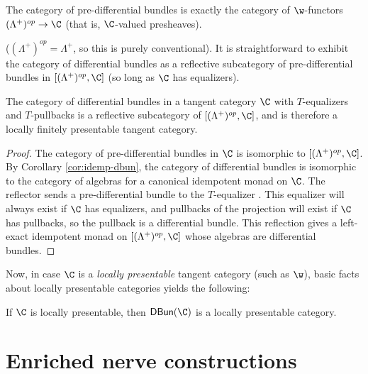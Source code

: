 \begin{lemma}%
	\label{lem:lambda-plus-is-pdb}
	The category of pre-differential bundles is exactly the category of $\w$-functors $(\Lambda^+)^{op} \to \C$ (that is, $\C$-valued presheaves).
\end{lemma}
($(\Lambda^+)^{op} = \Lambda^+$, so this is purely conventional).
It is straightforward to exhibit the category of differential bundles as a reflective subcategory of pre-differential bundles in $[(\Lambda^+)^{op}, \C]$ (so long as $\C$ has equalizers).
\begin{proposition}%
	\label{prop:Lambda-is-refl-subcat}
	The category of differential bundles in a tangent category $\C$ with $T$-equalizers and $T$-pullbacks is a reflective subcategory of $[(\Lambda^+)^{op}, \C]$, and is therefore a locally finitely presentable tangent category.
\end{proposition}
\begin{proof}
	The category of pre-differential bundles in $\C$ is isomorphic to $[(\Lambda^+)^{op}, \C]$. By Corollary \ref{cor:idemp-dbun}, the category of differential bundles is isomorphic to the category of algebras for a canonical idempotent monad on $\C$. The reflector sends a pre-differential bundle to the $T$-equalizer . This equalizer will always exist if $\C$ has equalizers, and pullbacks of the projection will exist if $\C$ has pullbacks, so the pullback is a differential bundle. This reflection gives a left-exact idempotent monad on $[(\Lambda^+)^{op}, \C]$ whose algebras are differential bundles.
\end{proof}
Now, in case $\C$ is a \emph{locally presentable} tangent category (such as $\w$), basic facts about locally presentable categories yields the following:
\begin{corollary}%
	\label{cor:Lambda-dense}
	If $\C$ is locally presentable, then $\mathsf{DBun}(\C)$ is a locally presentable category.
\end{corollary}


\section{Enriched nerve constructions}%
\label{sec:enriched-nerve-constructions}

